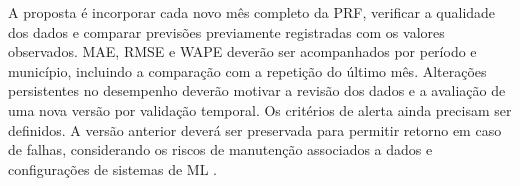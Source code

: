 \documentclass[12pt]{article}
\begin{document}
A proposta é incorporar cada novo mês completo da PRF, verificar a qualidade dos dados e comparar previsões previamente registradas com os valores observados. MAE, RMSE e WAPE deverão ser acompanhados por período e município, incluindo a comparação com a repetição do último mês. Alterações persistentes no desempenho deverão motivar a revisão dos dados e a avaliação de uma nova versão por validação temporal. Os critérios de alerta ainda precisam ser definidos. A versão anterior deverá ser preservada para permitir retorno em caso de falhas, considerando os riscos de manutenção associados a dados e configurações de sistemas de ML \cite{sculley2015debt}.

\end{document}
